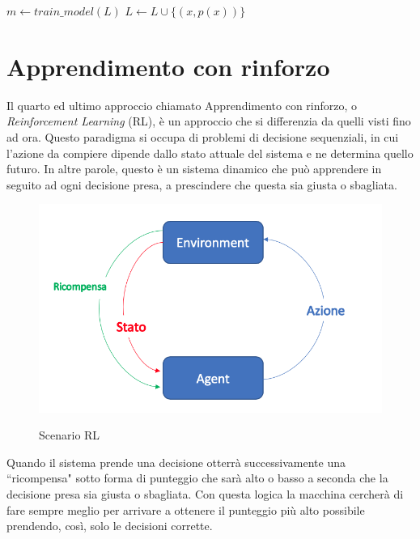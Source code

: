 \documentclass[12pt,italian]{report}
\begin{document}
\begin{algorithmic}[1]
	\Repeat
	\State $m \gets train\_model(L)$
	\State $L \gets L \cup \{(x, p(x))\}$
	\EndIf
	\EndFor
\end{algorithmic}

\section{Apprendimento con rinforzo}
Il quarto ed ultimo approccio chiamato Apprendimento con rinforzo, o \emph{Reinforcement Learning} (RL), è un approccio che si differenzia da quelli visti fino ad ora. Questo paradigma si occupa di problemi di decisione sequenziali, in cui l'azione da compiere dipende dallo stato attuale del sistema e ne determina quello futuro. In altre parole, questo è un sistema dinamico che può apprendere in seguito ad ogni decisione presa, a prescindere che questa sia giusta o sbagliata.

\begin{figure}[h!]
	\noindent
	\center
	\label{fig:rl_scenario}
	\includegraphics[scale=0.35]{../img/rl_scenario}
	\caption{Scenario RL}
\end{figure}


Quando il sistema prende una decisione otterrà successivamente una ``ricompensa" sotto forma di punteggio che sarà alto o basso a seconda che la decisione presa sia giusta o sbagliata. Con questa logica la macchina cercherà di fare sempre meglio per arrivare a ottenere il punteggio più alto possibile prendendo, così, solo le decisioni corrette. 
\end{document}
